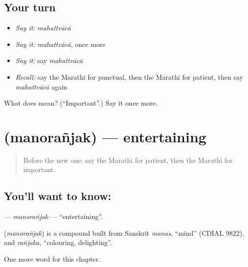 \subsection*{Your turn}
\begin{itemize}
\raggedright
  \item \emph{Say it:} \emph{mahattvācā}
  \item \emph{Say it:} \emph{mahattvācā}, once more
  \item \emph{Say it:} say \emph{mahattvācā}
  \item \emph{Recall:} say the Marathi for punctual, then the Marathi for patient, then say \emph{mahattvācā} again
\end{itemize}

\begin{tcolorbox}[breakable,colback=teal!4,colframe=teal!35!black,title={Before you move on}]
What does  mean? (\textquotedblleft{}Important\textquotedblright{}.) Say it once more.
\end{tcolorbox}
\section[\texorpdfstring{\mr{मनोरंजक} (manorañjak)}{मनोरंजक (manorañjak)}]{ (manorañjak) — entertaining}

\label{lesson:MR-C234-manoranjak}



\begin{quote}
Before the new one: say the Marathi for patient, then the Marathi for important.
\end{quote}

\subsection*{You'll want to know: }
\textbf{} — \emph{manorañjak} — \textquotedblleft{}entertaining\textquotedblright{}.

\begin{cousinweb}
\textbf{} (\emph{manorañjak}) is a compound built from Sanskrit \emph{manas}, \textquotedblleft{}mind\textquotedblright{} (CDIAL 9822), and \emph{rañjaka}, \textquotedblleft{}colouring, delighting\textquotedblright{}.
\end{cousinweb}

\begin{grammarlens}[title={What you've built}]
One more word for this chapter.
\end{grammarlens}

